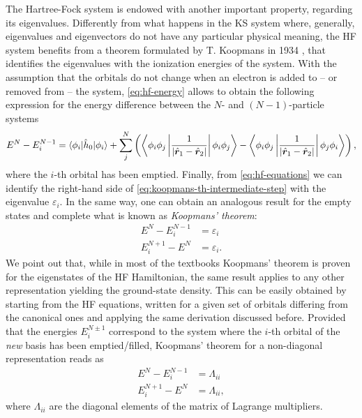 The Hartree-Fock system is endowed with another important property, regarding its eigenvalues. Differently from what happens in the KS system where, generally, eigenvalues and eigenvectors do not have any particular physical meaning, the HF system benefits from a theorem formulated by T. Koopmans in 1934 \cite{koopmans_uber_1934}, that identifies the eigenvalues with the ionization energies of the system. With the assumption that the orbitals do not change when an electron is added to -- or removed from -- the system, \cref{eq:hf-energy} allows to obtain the following expression for the energy difference between the $N$- and $(N-1)$-particle systems
%
\begin{equation}
    E^N - E^{N-1}_i = \braket{\phi_i|\hat{h}_0|\phi_i} + \sum_j^N \left( 
    \left\langle \phi_i\phi_j \left| \frac{1}{|\hat{{\bm r}}_1-\hat{{\bm r}}_2|} \right| \phi_i\phi_j \right\rangle
    - \left\langle \phi_i\phi_j \left| \frac{1}{|\hat{{\bm r}}_1-\hat{{\bm r}}_2|} \right| \phi_j\phi_i \right\rangle
    \right) ,
    \label{eq:koopmans-th-intermediate-step}
\end{equation}
%
where the $i$-th orbital has been emptied. Finally, from \cref{eq:hf-equations} we can identify the right-hand side of \cref{eq:koopmans-th-intermediate-step} with the eigenvalue $\varepsilon_i$. In the same way, one can obtain an analogous result for the empty states and complete what is known as \emph{Koopmans' theorem}:
%
\begin{equation}
    \begin{split}
    E^N - E^{N-1}_i &= \varepsilon_i \\
    E^{N+1}_i - E^N &= \varepsilon_i .
    \end{split}
    \label{eq:koopmans-theorem}
\end{equation}
%
We point out that, while in most of the textbooks Koopmans' theorem is proven for the eigenstates of the HF Hamiltonian, the same result applies to any other representation yielding the ground-state density. This can be easily obtained by starting from the HF equations, written for a given set of orbitals differing from the canonical ones and applying the same derivation discussed before. Provided that the energies $E^{N \pm 1}_i$ correspond to the system where the $i$-th orbital of the \emph{new} basis has been emptied/filled, Koopmans' theorem for a non-diagonal representation reads as
%
\begin{equation}
    \begin{split}
    E^N - E^{N-1}_i &= \Lambda_{ii} \\
    E^{N+1}_i - E^N &= \Lambda_{ii} ,
    \end{split}
    \label{eq:koopmans-theorem-noncanonical}
\end{equation}
%
where $\Lambda_{ii}$ are the diagonal elements of the matrix of Lagrange multipliers.

